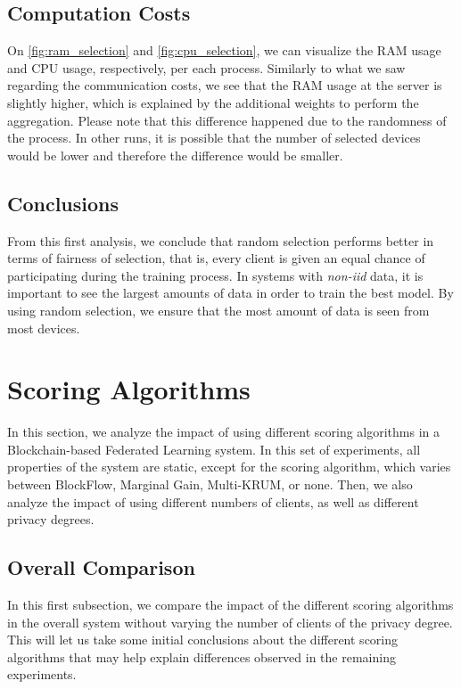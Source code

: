 \subsection{Computation Costs}

On \autoref{fig:ram_selection} and \autoref{fig:cpu_selection}, we can visualize the RAM usage and CPU usage, respectively, per each process. Similarly to what we saw regarding the communication costs, we see that the RAM usage at the server is slightly higher, which is explained by the additional weights to perform the aggregation. Please note that this difference happened due to the randomness of the process. In other runs, it is possible that the number of selected devices would be lower and therefore the difference would be smaller.

\subsection{Conclusions}

From this first analysis, we conclude that random selection performs better in terms of fairness of selection, that is, every client is given an equal chance of participating during the training process. In systems with \textit{non-iid} data, it is important to see the largest amounts of data in order to train the best model. By using random selection, we ensure that the most amount of data is seen from most devices.

\section{Scoring Algorithms}

In this section, we analyze the impact of using different scoring algorithms in a Blockchain-based Federated Learning system. In this set of experiments, all properties of the system are static, except for the scoring algorithm, which varies between BlockFlow, Marginal Gain, Multi-KRUM, or none. Then, we also analyze the impact of using different numbers of clients, as well as different privacy degrees.

\subsection{Overall Comparison}\label{horizontal:scoring_overall}

In this first subsection, we compare the impact of the different scoring algorithms in the overall system without varying the number of clients of the privacy degree. This will let us take some initial conclusions about the different scoring algorithms that may help explain differences observed in the remaining experiments.

